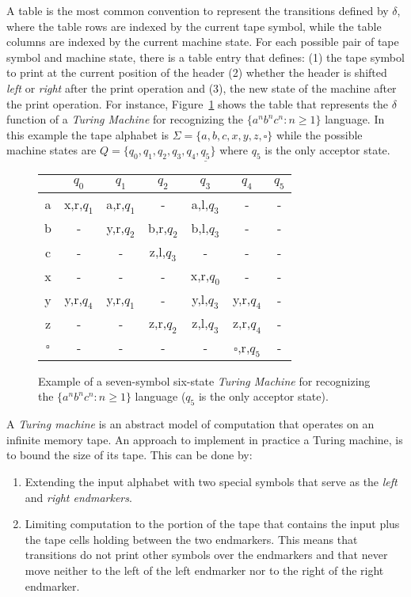 \documentclass[letterpaper]{article} %
\begin{document}
A table is the most common convention to represent the transitions defined by $\delta$, where the table rows are indexed by the current tape symbol, while the table columns are indexed by the current machine state. For each possible pair of tape symbol and machine state, there is a table entry that defines: (1) the tape symbol to print at the current position of the header (2) whether the header is shifted {\em left} or {\em right} after the print operation and (3), the new state of the machine after the print operation. For instance, Figure~\ref{tab:tm-anbncn} shows the table that represents the $\delta$ function of a {\em Turing Machine} for recognizing the $\{a^nb^nc^n : n \geq 1 \}$ language. In this example the tape alphabet is $\Sigma=\{a,b,c,x,y,z,\square\}$ while the possible machine states are $Q=\{q_0,q_1,q_2,q_3,q_4,\underline{q_5}\}$ where \underline{$q_5$} is the only acceptor state.

\begin{figure}
\begin{center}
    \begin{tabular}{| c | c | c | c | c | c | c |}
    \hline
      & $q_0$ & $q_1$ & $q_2$ & $q_3$ & $q_4$ & \underline{$q_5$} \\ \hline
    a & x,r,$q_1$ & a,r,$q_1$ & - &  a,l,$q_3$ & - & - \\ \hline
    b & - & y,r,$q_2$ & b,r,$q_2$ & b,l,$q_3$ & - & - \\ \hline
    c & - & - & z,l,$q_3$ & - & - & - \\ \hline
    x & - & - & - & x,r,$q_0$ & - & - \\ \hline
    y & y,r,$q_4$ & y,r,$q_1$ & - & y,l,$q_3$ & y,r,$q_4$ & - \\ \hline
    z & - & - & z,r,$q_2$ & z,l,$q_3$ & z,r,$q_4$ & - \\\hline
    $\square$ & - & - & - & - & $\square$,r,$q_5$  & - \\                
    \hline
    \end{tabular}
\end{center}
  \caption{\small Example of a seven-symbol six-state {\em Turing Machine} for recognizing the $\{a^nb^nc^n : n \geq 1 \}$ language (\underline{$q_5$} is the only acceptor state).}
  \label{tab:tm-anbncn}
\end{figure}

A {\em Turing machine} is an abstract model of computation that operates on an infinite memory tape. An approach to implement in practice a Turing machine, is to bound the size of its tape. This can be done by: 
\begin{enumerate}
\item Extending the input alphabet with two special symbols that serve as the {\em left} and {\em right endmarkers}.
\item Limiting computation to the portion of the tape that contains the input plus the tape cells holding between the two endmarkers. This means that transitions do not print other symbols over the endmarkers and that never move neither to the left of the left endmarker nor to the right of the right endmarker.
\end{enumerate}
\end{document}
